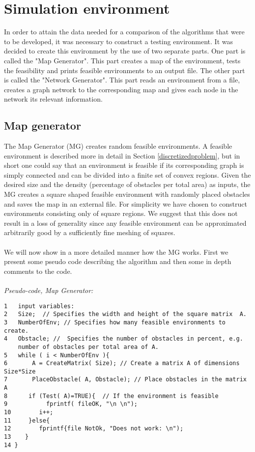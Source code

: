 \chapter{Simulation environment}
In order to attain the data needed for a comparison of the algorithms that were to be developed, it was necessary to construct a testing environment. It was decided to create this environment by the use of two separate parts. One part is called the "Map Generator". This part creates a map of the environment, tests the feasibility and prints feasible environments to an output file. The other part is called the "Network Generator". This part reads an environment from a file, creates a graph network to the corresponding map and gives each node in the network its relevant information.
%
\section{Map generator}
The Map Generator (MG) creates random feasible environments. A feasible environment is described more in detail in Section \ref{discretizedproblem}, but in short one could say that an environment is feasible if its corresponding graph is simply connected and can be divided into a finite set of convex regions. Given the desired size and the density (percentage of obstacles per total area) as inputs, the MG creates a square shaped feasible environment with randomly placed obstacles and saves the map in an external file. For simplicity we have chosen to construct environments consisting only of square regions. %
We suggest that this does not result in a loss of generality since any feasible environment can be approximated arbitrarily good by a sufficiently fine meshing of squares. \\ %
\\We will now show in a more detailed manner how the MG works. First we present some pseudo code describing the algorithm and then some in depth comments to the code.\\
\\\noindent\emph{Pseudo-code, Map Generator:}
\begin{verbatim}
1   input variables:
2   Size;  // Specifies the width and height of the square matrix  A.
3   NumberOfEnv; // Specifies how many feasible environments to create.
4   Obstacle; //  Specifies the number of obstacles in percent, e.g. 
    number of obstacles per total area of A.
5   while ( i < NumberOfEnv ){
6       A = CreateMatrix( Size); // Create a matrix A of dimensions Size*Size
7       PlaceObstacle( A, Obstacle); // Place obstacles in the matrix A
8      if (Test( A)=TRUE){  // If the environment is feasible
9           fprintf( fileOK, "\n \n");
10        i++;
11     }else{
12        fprintf{file NotOk, "Does not work: \n");
13    }
14 }
\end{verbatim}
